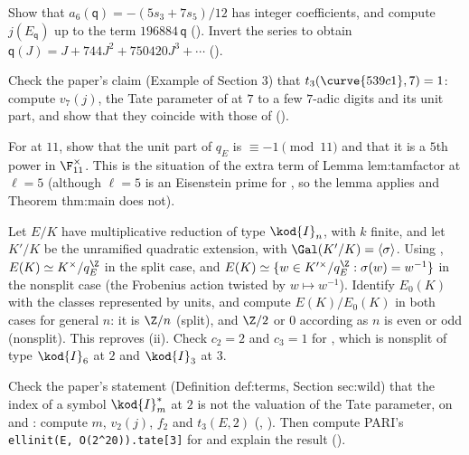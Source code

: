 \begin{exercise}\label{exer:reduction:tate-series}
Show that $a_6(\mathsf q)=-(5s_3+7s_5)/12$ has integer coefficients, and compute $j(E_{\mathsf q})$ up to the term $196884\,\mathsf q$
(). Invert the series to obtain $\mathsf q(J)=J+744J^2+750420J^3+\cdots$ ().
\end{exercise}

\begin{exercise}\label{exer:reduction:t3-539}
Check the paper's claim (Example of Section 3) that $t_3(\curve{539c1},7)=1$: compute $v_7(j)$, the Tate parameter of  at $7$ to a
few $7$-adic digits and its unit part, and show that they coincide with those of  ().
\end{exercise}

\begin{exercise}\label{exer:reduction:11a1-unit}
For  at $11$, show that the unit part of $q_E$ is $\equiv-1\pmod{11}$ and that it is a $5$th power in $\F_{11}^\times$. This is the
situation of the extra term of Lemma lem:tamfactor at $\ell=5$ (although $\ell=5$ is an Eisenstein prime for , so the lemma
applies and Theorem thm:main does not).
\end{exercise}

\begin{exercise}\label{exer:reduction:tamagawa-mult}
Let $E/K$ have multiplicative reduction of type $\kod{I}_n$, with $k$ finite, and let $K'/K$ be the unramified quadratic extension, with
$\Gal(K'/K)=\langle\sigma\rangle$. Using , $E(K)\simeq K^\times/q_E^{\Z}$ in the split case, and
$E(K)\simeq\{w\in K'^\times/q_E^{\Z}:\sigma(w)=w^{-1}\}$ in the nonsplit case (the Frobenius action twisted by $w\mapsto w^{-1}$). Identify
$E_0(K)$ with the classes represented by units, and compute $E(K)/E_0(K)$ in both cases for general $n$: it is $\Z/n$ (split), and
$\Z/2$ or $0$ according as $n$ is even or odd (nonsplit). This reproves (ii). Check $c_2=2$ and $c_3=1$ for
, which is nonsplit of type $\kod{I}_6$ at $2$ and $\kod{I}_3$ at $3$.
\end{exercise}

\begin{exercise}\label{exer:reduction:Instar2}
Check the paper's statement (Definition def:terms, Section sec:wild) that the index of a symbol $\kod{I}_m^*$ at $2$ is not the valuation of the
Tate parameter, on  and : compute $m$, $v_2(j)$, $f_2$ and $t_3(E,2)$ (,
). Then compute PARI's \texttt{ellinit(E, O(2\^{}20)).tate[3]} for  and explain the result
().
\end{exercise}

